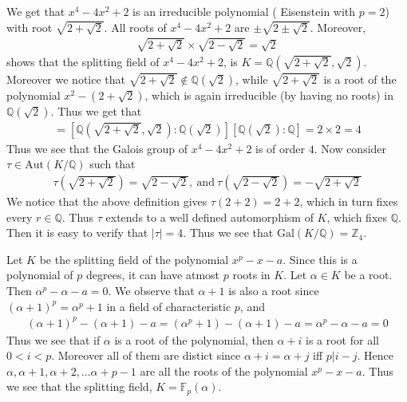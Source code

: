 \documentclass[12pt]{exam}
\theoremstyle{plain} %
\theoremstyle{definition} %
\theoremstyle{remark} %
\begin{document}
\begin{questions}
    \question
    \begin{solution}
      We get that $x^4 - 4x^2 + 2$ is an irreducible polynomial (
      Eisenstein with $p = 2$) with root $\sqrt{2 + \sqrt{2}}$. All
      roots of $x^4 - 4x^2 + 2$ are $\pm \sqrt{2 \pm \sqrt{2}}$. Moreover,
      \begin{align*}
        \sqrt{2 + \sqrt{2}} \times \sqrt{2 - \sqrt{2}} = \sqrt{2}
      \end{align*}
      shows that the splitting field of $x^4 - 4x^2 + 2$, is $
      K = \mathbb{Q}(\sqrt{2 + \sqrt{2}}, \sqrt{2})$. Moreover we notice
      that $\sqrt{2 + \sqrt{2}} \not\in \mathbb{Q}(\sqrt{2})$, while
      $\sqrt{2 + \sqrt{2}}$ is a root of the polynomial $x^2 - (2 +
      \sqrt{2})$, which is again irreducible (by having no roots) in
      $\mathbb{Q}(\sqrt{2})$.
      Thus we get that
      \begin{align*}
        [\mathbb{Q}( \sqrt{2 + \sqrt{2}}, \sqrt{2}) : \mathbb{Q}] =
        [\mathbb{Q}( \sqrt{2 + \sqrt{2}}, \sqrt{2}) :
        \mathbb{Q}(\sqrt{2})] [ \mathbb{Q}(\sqrt{2}): \mathbb{Q}] = 2
        \times 2 = 4
      \end{align*}
      Thus we see that the Galois group of $x^4 - 4x^2 + 2$ is of order
      $4$. Now consider $\tau \in \textrm{Aut}(K / \mathbb{Q})$ such that
      \begin{align*}
        \tau(\sqrt{2 + \sqrt{2}}) = \sqrt{2 - \sqrt{2}}, \ \textrm{and}
        \ \tau(\sqrt{2 - \sqrt{2}}) = - \sqrt{2 + \sqrt{2}}
      \end{align*}
      We notice that the above definition gives $\tau(2 + 2) = 2 + 2$,
      which in turn fixes every $r \in \mathbb{Q}$. Thus $\tau$ extends
      to a well defined automorphism of $K$, which fixes $\mathbb{Q}$.
      Then it is easy to verify that $|\tau| = 4$. Thus we see that
      $\textrm{Gal}(K/\mathbb{Q}) = \mathbb{Z}_4$.

    \end{solution}

    \question
    \begin{solution}
      Let $K$ be the splitting field of the polynomial $x^p - x - a$.
      Since this is a polynomial of $p$ degrees, it can have atmost
      $p$ roots in $K$. Let $\alpha \in K$ be a root. Then $\alpha^p
      - \alpha - a  = 0$. We observe that $\alpha + 1$ is also a root
      since $(\alpha + 1)^p = \alpha^p + 1$ in a field of
      characteristic $p$, and
      \begin{align*}
        (\alpha + 1)^p - (\alpha + 1) - a = (\alpha^p + 1) - (\alpha
        + 1) - a = \alpha^p - \alpha - a  = 0
      \end{align*}
      Thus we see that if $\alpha$ is a root of the polynomial, then
      $\alpha + i$ is a root for all $0 < i < p$. Moreover all of
      them are distict since $\alpha + i = \alpha + j$ iff $p|i-j$.
      Hence $ \alpha, \alpha + 1, \alpha + 2, \ldots \alpha+ p -1$
      are all the roots of the polynomial $ x^p - x - a$. Thus we see
      that the splitting field, $K = \mathbb{F}_p(\alpha)$.


\end{solution}
\end{questions}
\end{document}

